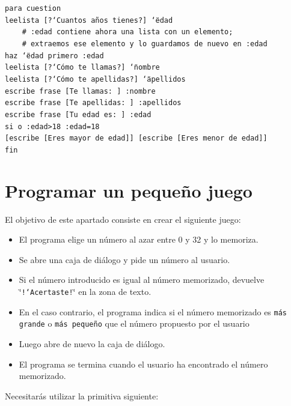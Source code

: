 \documentclass[12pt,twoside,spanish,a4paper]{report}
\begin{document}
\noindent \texttt{para cuestion} \\
\texttt{leelista [?`Cuantos a\~nos tienes?] \char`\"{}edad} \\
\verb+    +\texttt{\# :edad contiene ahora una lista con un elemento;} \\
\verb+    +\texttt{\# extraemos ese elemento y lo guardamos de nuevo en :edad} \\
\texttt{haz \char`\"{}edad primero :edad} \\
\texttt{leelista [?`C\'omo te llamas?] \char`\"{}nombre} \\
\texttt{leelista [?`C\'omo te apellidas?] \char`\"{}apellidos} \\
\texttt{escribe frase [Te llamas: ] :nombre} \\
\texttt{escribe frase [Te apellidas: ] :apellidos} \\
\texttt{escribe frase [Tu edad es: ] :edad} \\
\texttt{si o :edad>18 :edad=18} \\
\texttt{[escribe [Eres mayor de edad]] [escribe [Eres menor de edad]]} \\
\noindent \texttt{fin}

\section{Programar un peque\~no juego}
   \label{sub:Pequeno-Juego}

El objetivo de este apartado consiste en crear el siguiente juego:
\begin{itemize}
   \item El programa elige un n\'umero al azar entre 0 y 32 y lo memoriza.
   \item Se abre una caja de di\'alogo y pide un n\'umero al usuario.
   \item Si el n\'umero introducido es igual al n\'umero memorizado,
      devuelve \char`\"{}\texttt{!`Acertaste!}\char`\"{} en la zona de
      texto.
   \item En el caso contrario, el programa indica si el n\'umero memorizado es
      \texttt{m\'as grande} o \texttt{m\'as peque\~no} que el n\'umero propuesto
      por el usuario
   \item Luego abre de nuevo la caja de di\'alogo.
   \item El programa se termina cuando el usuario ha encontrado el n\'umero
      memorizado.
\end{itemize}
\noindent Necesitar\'as utilizar la primitiva siguiente: \\
\end{document}
